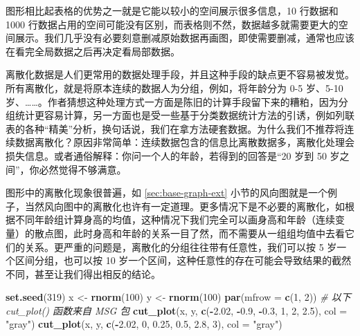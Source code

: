 \documentclass[
  b5paper,
  UTF8,twoside]{book}
\newenvironment{Shaded}{\begin{snugshade}}{\end{snugshade}}
\newcommand{\AttributeTok}[1]{\textcolor[rgb]{0.13,0.29,0.53}{#1}}
\newcommand{\CommentTok}[1]{\textcolor[rgb]{0.56,0.35,0.01}{\textit{#1}}}
\newcommand{\DecValTok}[1]{\textcolor[rgb]{0.00,0.00,0.81}{#1}}
\newcommand{\FloatTok}[1]{\textcolor[rgb]{0.00,0.00,0.81}{#1}}
\newcommand{\FunctionTok}[1]{\textcolor[rgb]{0.13,0.29,0.53}{\textbf{#1}}}
\newcommand{\NormalTok}[1]{#1}
\newcommand{\OtherTok}[1]{\textcolor[rgb]{0.56,0.35,0.01}{#1}}
\newcommand{\SpecialCharTok}[1]{\textcolor[rgb]{0.81,0.36,0.00}{\textbf{#1}}}
\newcommand{\StringTok}[1]{\textcolor[rgb]{0.31,0.60,0.02}{#1}}
\begin{document}
图形相比起表格的优势之一就是它能以较小的空间展示很多信息，10 行数据和 1000 行数据占用的空间可能没有区别，而表格则不然，数据越多就需要更大的空间展示。我们几乎没有必要刻意删减原始数据再画图，即使需要删减，通常也应该在看完全局数据之后再决定看局部数据。

离散化数据是人们更常用的数据处理手段，并且这种手段的缺点更不容易被发觉。所有离散化，就是将原本连续的数据人为分组，例如，将年龄分为 0-5 岁、5-10 岁、\ldots\ldots。作者猜想这种处理方式一方面是陈旧的计算手段留下来的糟粕，因为分组统计更容易计算，另一方面也是受一些基于分类数据统计方法的引诱，例如列联表的各种``精美''分析，换句话说，我们在拿方法硬套数据。为什么我们不推荐将连续数据离散化？原因非常简单：连续数据包含的信息比离散数据多，离散化处理会损失信息。或者通俗解释：你问一个人的年龄，若得到的回答是``20 岁到 50 岁之间''，你必然觉得不够满意。

图形中的离散化现象很普遍，如 \ref{sec:base-graph-ext} 小节的风向图就是一个例子，当然风向图中的离散化也许有一定道理。更多情况下是不必要的离散化，如根据不同年龄组计算身高的均值，这种情况下我们完全可以画身高和年龄（连续变量）的散点图，此时身高和年龄的关系一目了然，而不需要从一组组均值中去看它们的关系。更严重的问题是，离散化的分组往往带有任意性，我们可以按 5 岁一个区间分组，也可以按 10 岁一个区间，这种任意性的存在可能会导致结果的截然不同，甚至让我们得出相反的结论。

\begin{Shaded}
\begin{Highlighting}[]
\FunctionTok{set.seed}\NormalTok{(}\DecValTok{319}\NormalTok{)}
\NormalTok{x }\OtherTok{\textless{}{-}} \FunctionTok{rnorm}\NormalTok{(}\DecValTok{100}\NormalTok{)}
\NormalTok{y }\OtherTok{\textless{}{-}} \FunctionTok{rnorm}\NormalTok{(}\DecValTok{100}\NormalTok{)}
\FunctionTok{par}\NormalTok{(}\AttributeTok{mfrow =} \FunctionTok{c}\NormalTok{(}\DecValTok{1}\NormalTok{, }\DecValTok{2}\NormalTok{)) }\CommentTok{\# 以下 cut\_plot() 函数来自 MSG 包}
\FunctionTok{cut\_plot}\NormalTok{(x, y, }\FunctionTok{c}\NormalTok{(}\SpecialCharTok{{-}}\FloatTok{2.02}\NormalTok{, }\SpecialCharTok{{-}}\FloatTok{0.9}\NormalTok{, }\SpecialCharTok{{-}}\FloatTok{0.3}\NormalTok{, }\DecValTok{1}\NormalTok{, }\DecValTok{2}\NormalTok{, }\FloatTok{2.5}\NormalTok{), }\AttributeTok{col =} \StringTok{"gray"}\NormalTok{)}
\FunctionTok{cut\_plot}\NormalTok{(x, y, }\FunctionTok{c}\NormalTok{(}\SpecialCharTok{{-}}\FloatTok{2.02}\NormalTok{, }\DecValTok{0}\NormalTok{, }\FloatTok{0.25}\NormalTok{, }\FloatTok{0.5}\NormalTok{, }\FloatTok{2.8}\NormalTok{, }\DecValTok{3}\NormalTok{), }\AttributeTok{col =} \StringTok{"gray"}\NormalTok{)}
\end{Highlighting}
\end{Shaded}
\end{document}
